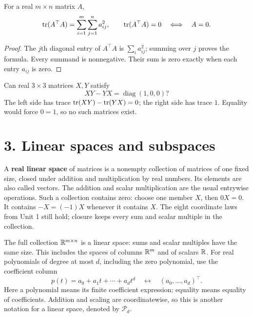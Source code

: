 \begin{proposition}\label{prop:02:squares}
For a real \(m\times n\) matrix \(A\),
\[
\operatorname{tr}(A^\top A)=\sum_{i=1}^m\sum_{j=1}^n a_{ij}^2,
\qquad \operatorname{tr}(A^\top A)=0\quad\Longleftrightarrow\quad A=0.
\]
\end{proposition}
\begin{proof}
The \(j\)th diagonal entry of \(A^\top A\) is \(\sum_i a_{ij}^2\);
summing over \(j\) proves the formula. Every summand is nonnegative.
Their sum is zero exactly when each entry \(a_{ij}\) is zero.
\end{proof}

\begin{example}\label{example:02:commutator}
Can real \(3\times3\) matrices \(X,Y\) satisfy
\[
XY-YX=\operatorname{diag}(1,0,0)?
\]
The left side has trace \(\operatorname{tr}(XY)-\operatorname{tr}(YX)=0\); the right side has
trace \(1\). Equality would force \(0=1\), so no such matrices exist.
\end{example}

\section*{3. Linear spaces and subspaces}

A \textbf{real linear space} of matrices is a nonempty collection of
matrices of one fixed size, closed under addition and multiplication by
real numbers. Its elements are also called vectors. The addition and
scalar multiplication are the usual entrywise operations.
Such a collection contains zero: choose one member \(X\), then
\(0X=0\). It contains \(-X=(-1)X\) whenever it contains \(X\).
The eight coordinate laws from Unit 1 still hold; closure keeps every
sum and scalar multiple in the collection.

The full collection \(\mathbb R^{m\times n}\) is a linear space: sums and
scalar multiples have the same size. This includes the spaces of columns \(\mathbb R^m\) and of scalars \(\mathbb R\). For real polynomials of degree
at most \(d\), including the zero polynomial, use the coefficient column
\[
p(t)=a_0+a_1t+\cdots+a_dt^d
\quad\longleftrightarrow\quad(a_0,\ldots,a_d)^\top.
\]
Here a polynomial means its finite coefficient expression; equality
means equality of coefficients. Addition and scaling are coordinatewise,
so this is another notation for a linear space, denoted by \(\mathcal P_d\).

